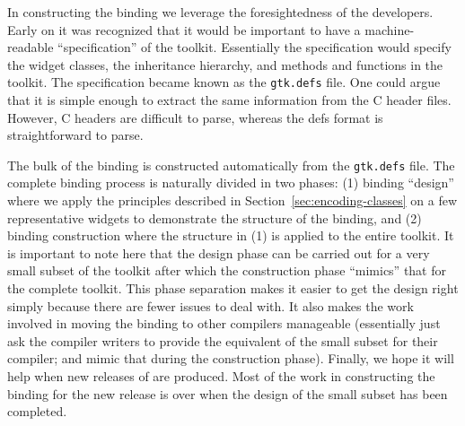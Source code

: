\documentclass[workingdraft]{usetex-v1}
\begin{document}
In constructing the \mgtk binding we leverage the foresightedness of
the \gtk developers. Early on it was recognized that it would be
important to have a machine-readable ``specification'' of the toolkit.
Essentially the specification would specify the widget classes, the
inheritance hierarchy, and methods and functions in the toolkit. The
specification became known as the \texttt{gtk.defs} file. One could
argue that it is simple enough to extract the same information from
the C header files. However, C headers are difficult to parse, whereas
the defs format is straightforward to parse.

The bulk of the \mgtk binding is constructed automatically from the
\texttt{gtk.defs} file.  The complete binding process is naturally
divided in two phases: (1) binding ``design'' where we apply the
principles described in Section~\ref{sec:encoding-classes} on a few
representative widgets to demonstrate the structure of the binding,
and (2) binding construction where the structure in (1) is applied to
the entire toolkit. It is important to note here that the design phase
can be carried out for a very small subset of the toolkit after which
the construction phase ``mimics'' that for the complete toolkit.
This phase separation makes it easier to get the design right simply
because there are fewer issues to deal with.  It also makes the work
involved in moving the binding to other \sml compilers manageable
(essentially just ask the compiler writers to provide the equivalent
of the small subset for their compiler; and mimic that during the
construction phase). Finally, we hope it will help when new releases
of \gtk are produced. Most of the work in constructing the binding for
the new release is over when the design of the small subset has been
completed.
\end{document}
